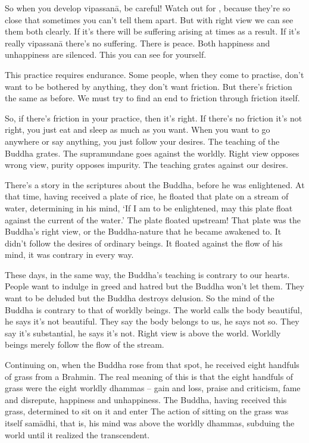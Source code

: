 So when you develop vipassan\=a, be careful! Watch out for , because they're so close that sometimes you can't tell them apart. But with right view we can see them both clearly. If it's  there will be suffering arising at times as a result. If it's really vipassan\=a there's no suffering. There is peace. Both happiness and unhappiness are silenced. This you can see for yourself.

This practice requires endurance. Some people, when they come to practise, don't want to be bothered by anything, they don't want friction. But there's friction the same as before. We must try to find an end to friction through friction itself.

So, if there's friction in your practice, then it's right. If there's no friction it's not right, you just eat and sleep as much as you want. When you want to go anywhere or say anything, you just follow your desires. The teaching of the Buddha grates. The supramundane goes against the worldly. Right view opposes wrong view, purity opposes impurity. The teaching grates against our desires.

There's a story in the scriptures about the Buddha, before he was enlightened. At that time, having received a plate of rice, he floated that plate on a stream of water, determining in his mind, `If I am to be enlightened, may this plate float against the current of the water.' The plate floated upstream! That plate was the Buddha's right view, or the Buddha-nature that he became awakened to. It didn't follow the desires of ordinary beings. It floated against the flow of his mind, it was contrary in every way.

These days, in the same way, the Buddha's teaching is contrary to our hearts. People want to indulge in greed and hatred but the Buddha won't let them. They want to be deluded but the Buddha destroys delusion. So the mind of the Buddha is contrary to that of worldly beings. The world calls the body beautiful, he says it's not beautiful. They say the body belongs to us, he says not so. They say it's substantial, he says it's not. Right view is above the world. Worldly beings merely follow the flow of the stream.

Continuing on, when the Buddha rose from that spot, he received eight handfuls of grass from a Brahmin. The real meaning of this is that the eight handfuls of grass were the eight worldly dhammas -- gain and loss, praise and criticism, fame and disrepute, happiness and unhappiness. The Buddha, having received this grass, determined to sit on it and enter  The action of sitting on the grass was itself sam\=adhi, that is, his mind was above the worldly dhammas, subduing the world until it realized the transcendent.

